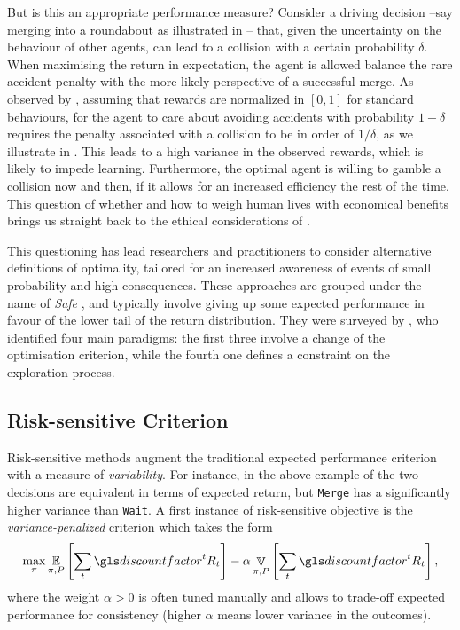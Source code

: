 But is this an appropriate performance measure? Consider a driving decision --say merging into a roundabout as illustrated in -- that, given the uncertainty on the behaviour of other agents, can lead to a collision with a certain probability $\delta$. When maximising the return in expectation, the agent is allowed balance the rare accident penalty with the more likely perspective of a successful merge. As observed by \citet{ShalevShwartz2017}, assuming that rewards are normalized in $[0, 1]$ for standard behaviours, for the agent to care about avoiding accidents with probability $1-\delta$ requires the penalty associated with a collision to be in order of $1/\delta$, as we illustrate in . This leads to a high variance in the observed rewards, which is likely to impede learning. 
Furthermore, the optimal agent is willing to gamble a collision now and then, if it allows for an increased efficiency the rest of the time. This question of whether and how to weigh human lives with economical benefits brings us straight back to the ethical considerations of .

This questioning has lead researchers and practitioners to consider alternative definitions of optimality, tailored for an increased awareness of events of small probability and high consequences. These approaches are grouped under the name of \emph{Safe} , and typically involve giving up some expected performance in favour of the lower tail of the return distribution. They were surveyed by \citet{Garcia2015}, who identified four main paradigms: the first three involve a change of the optimisation criterion, while the fourth one defines a constraint on the exploration process.

\subsection{Risk-sensitive Criterion}

Risk-sensitive methods augment the traditional expected performance criterion with a measure of \textit{variability}. For instance, in the above example of  the two decisions are equivalent in terms of expected return, but \texttt{Merge} has a significantly higher variance than \texttt{Wait}.  A first instance of risk-sensitive objective is the \emph{variance-penalized} criterion \citep{Markowitz59} which takes the form
\begin{equation*}
\max_\pi \expectedvalue_{\pi, P} \left[\sum_t \discount^t R_t\right] - \alpha\mathop{\mathbb{V}}_{\pi, P} \left[\sum_t \discount^t R_t \right],
\end{equation*}
where the weight $\alpha > 0$ is often tuned manually and allows to trade-off expected performance for consistency (higher $\alpha$ means lower variance in the outcomes).

